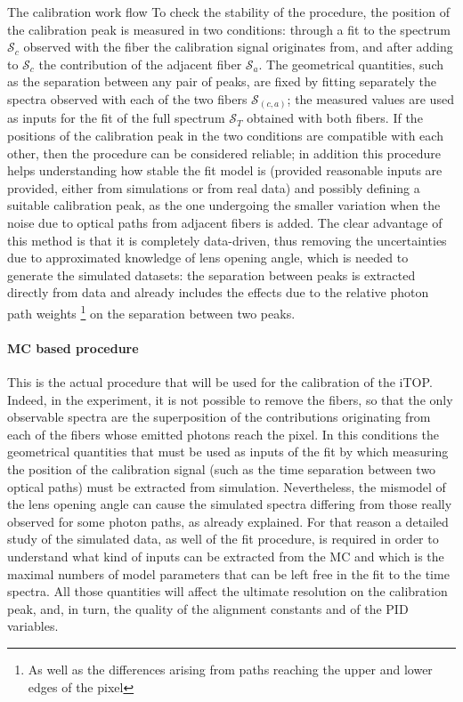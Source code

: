 \documentclass[a4paper,11pt]{article}
\begin{document}
\begin{subsection}{The calibration work flow}
To check the stability of the procedure, the position of the calibration peak is measured in two conditions: through a fit to the spectrum $\mathcal{S}_c$ observed with the fiber the calibration signal originates from, and after adding to $\mathcal{S}_c$ the contribution of the adjacent fiber $\mathcal{S}_a$. The geometrical quantities, such as the separation between any pair of peaks, are fixed by fitting separately the spectra observed with each of the two fibers $\mathcal{S}_{(c,a)}$; the measured values are used as inputs for the fit of the full spectrum $\mathcal{S}_T$ obtained with both fibers. If the positions of the calibration peak in the two conditions are compatible with each other, then the procedure can be considered reliable; in addition this procedure helps understanding how stable the fit model is (provided reasonable inputs are provided, either from simulations or from real data) and possibly defining a suitable calibration peak, as the one undergoing the smaller variation when the noise due to optical paths from adjacent fibers is added. The clear advantage of this method is that it is completely data-driven, thus removing the uncertainties due to approximated knowledge of lens opening angle, which is needed to generate the simulated datasets: the separation between peaks is extracted directly from data and already includes the effects due to the relative photon path weights \footnote{As well as the differences arising from paths reaching the upper and lower edges of the pixel} on the separation between two peaks.


\paragraph{MC based procedure} This is the actual procedure that will be used for the calibration of the iTOP. Indeed, in the experiment, it is not possible to remove the fibers, so that the only observable spectra are the superposition of the contributions originating from each of the fibers whose emitted photons reach the pixel. In this conditions the geometrical quantities that must be used as inputs of the fit by which measuring the position of the calibration signal (such as the time separation between two optical paths) must be extracted from simulation. Nevertheless, the mismodel of the lens opening angle can cause the simulated spectra differing from those really observed for some photon paths, as already explained. For that reason a detailed study of the simulated data, as well of the fit procedure, is required in order to understand what kind of inputs can be extracted from the MC and which is the maximal numbers of model parameters that can be left free in the fit to the time spectra.  All those quantities will affect the ultimate resolution on the calibration peak, and, in turn, the quality of the alignment constants and of the PID variables. 


\end{subsection}
\end{document}
